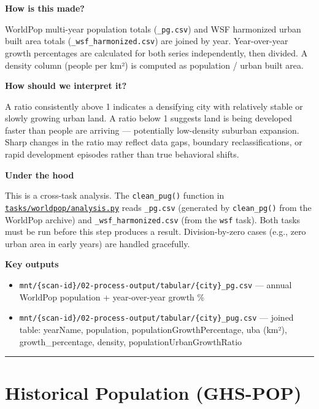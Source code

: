 \documentclass[
  letterpaper,
  DIV=11,
  numbers=noendperiod]{scrreprt}
\providecommand{\tightlist}{%
  \setlength{\itemsep}{0pt}\setlength{\parskip}{0pt}}
\begin{document}
\textbf{How is this made?}

WorldPop multi-year population totals (\texttt{\_pg.csv}) and WSF
harmonized urban built area totals (\texttt{\_wsf\_harmonized.csv}) are
joined by year. Year-over-year growth percentages are calculated for
both series independently, then divided. A density column (people per
km²) is computed as population / urban built area.

\textbf{How should we interpret it?}

A ratio consistently above 1 indicates a densifying city with relatively
stable or slowly growing urban land. A ratio below 1 suggests land is
being developed faster than people are arriving --- potentially
low-density suburban expansion. Sharp changes in the ratio may reflect
data gaps, boundary reclassifications, or rapid development episodes
rather than true behavioral shifts.

\textbf{Under the hood}

This is a cross-task analysis. The \texttt{clean\_pug()} function in
\href{../tasks/worldpop/analysis.py}{\texttt{tasks/worldpop/analysis.py}}
reads \texttt{\_pg.csv} (generated by \texttt{clean\_pg()} from the
WorldPop archive) and \texttt{\_wsf\_harmonized.csv} (from the
\texttt{wsf} task). Both tasks must be run before this step produces a
result. Division-by-zero cases (e.g., zero urban area in early years)
are handled gracefully.

\textbf{Key outputs}

\begin{itemize}
\tightlist
\item
  \texttt{mnt/\{scan-id\}/02-process-output/tabular/\{city\}\_pg.csv}
  --- annual WorldPop population + year-over-year growth \%
\item
  \texttt{mnt/\{scan-id\}/02-process-output/tabular/\{city\}\_pug.csv}
  --- joined table: yearName, population, populationGrowthPercentage,
  uba (km²), growth\_percentage, density, populationUrbanGrowthRatio
\end{itemize}

\begin{center}\rule{0.5\linewidth}{0.5pt}\end{center}

\section{Historical Population
(GHS-POP)}\label{historical-population-ghs-pop}
\end{document}
